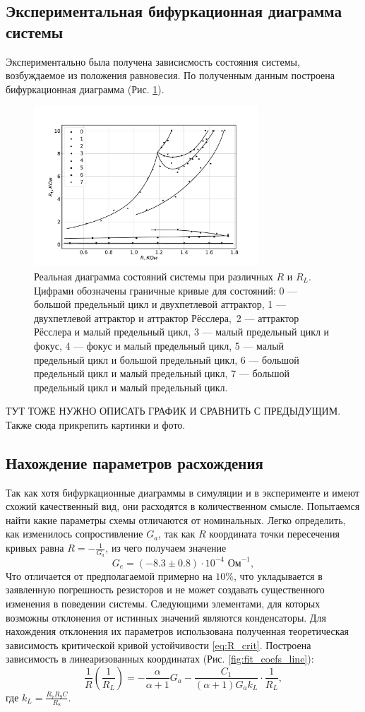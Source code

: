 \documentclass[12pt]{article}
\begin{document}
\subsection*{Экспериментальная бифуркационная диаграмма системы}
Экспериментально была получена зависисмость состояния системы, возбуждаемое из положения равновесия. По 
полученным данным построена бифуркационная диаграмма (Рис. \ref{fig:real_bif_diag}). 
\begin{figure}[H]
	\centering
	\includegraphics[width=0.75\textwidth]{bif_diag_lines.pdf}
	\caption{Реальная диаграмма состояний системы при различных $R$ и $R_L$. 
	Цифрами обозначены граничные кривые для состояний: 
	0 --- большой предельный цикл и двухпетлевой аттрактор,
	1 --- двухпетлевой аттрактор и аттрактор Рёсслера,\
	2 --- аттрактор Рёсслера и малый предельный цикл,
	3 --- малый предельный цикл и фокус, 
	4 --- фокус и малый предельный цикл, 
	5 --- малый предельный цикл и большой предельный цикл,
	6 --- большой предельный цикл и малый предельный цикл,
	7 --- большой предельный цикл и малый предельный цикл.}
	\label{fig:real_bif_diag}
\end{figure}
ТУТ ТОЖЕ НУЖНО ОПИСАТЬ ГРАФИК И СРАВНИТЬ С ПРЕДЫДУЩИМ. Также сюда прикрепить картинки и фото.


\subsection*{Нахождение параметров расхождения}
Так как хотя бифуркационные диаграммы в симуляции и в эксперименте и имеют схожий качественный вид, они 
расходятся в количественном смысле. Попытаемся найти какие параметры схемы отличаются от номинальных.
Легко определить, как изменилось сопростивление $G_a$, так как $R$ координата точки пересечения кривых 
равна $R = -\frac{1}{G_a}$, из чего получаем значение
\[
	G_e = (-8.3 \pm 0.8) \cdot 10^{-4} \text{ Ом}^{-1}, 
\]    
Что отличается от предполагаемой примерно на $10\%$, что укладывается в заявленную погрешность резисторов и 
не может создавать существенного изменения в поведении системы.  
Следующими элементами, для которых возможны отклонения от истинных значений являются конденсаторы. 
Для нахождения отклонения их параметров использована полученная теоретическая зависимость критической кривой устойчивости \ref{eq:R_crit}. 
Построена зависимость в линеаризованных координатах (Рис. \ref{fig:fit_coefs_line}): 
\[
	\frac{1}{R} \left( \frac{1}{R_L} \right) = -\frac{\alpha}{\alpha + 1} G_a - \frac{C_1}{(\alpha + 1) G_a k_L} \cdot \frac{1}{R_L},
\]
где $k_L = \frac{R_7 R_9 C}{R_8}$. 
\end{document}

